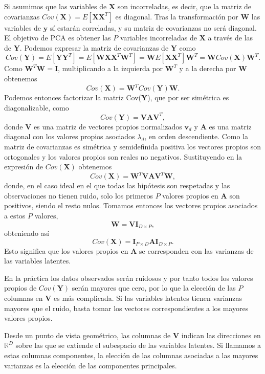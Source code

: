 Si asumimos que las variables de $\textbf{X}$ son incorreladas, es decir, que la matriz de covarianzas $Cov(\textbf{X}) = E[\textbf{X}\textbf{X}^T]$ es diagonal. Tras la transformación por $\textbf{W}$ las variables de $\textbf{y}$ sí estarán correladas, y su matriz de covarianzas no será diagonal. El objetivo de PCA es obtener las $P$ variables incorreladas de $\textbf{X}$ a través de las de $\textbf{Y}$. Podemos expresar la matriz de covarianzas de $\textbf{Y}$ como $$Cov(\textbf{Y}) = E[\textbf{Y}\textbf{Y}^T] = E[\textbf{W}\textbf{X}\textbf{X}^T\textbf{W}^T] = \textbf{W}E[\textbf{X}\textbf{X}^T]\textbf{W}^T = \textbf{W}Cov(\textbf{X})\textbf{W}^T.$$ Como $\textbf{W}^T\textbf{W} = \textbf{I}$, multiplicando a la izquierda por $\textbf{W}^T$ y a la derecha por $\textbf{W}$ obtenemos $$Cov(\textbf{X}) = \textbf{W}^TCov(\textbf{Y})\textbf{W}. $$ Podemos entonces factorizar la matriz Cov(\textbf{Y}), que por ser simétrica es diagonalizable, como $$ Cov(\textbf{Y}) = \textbf{V}\textbf{A}\textbf{V}^T,$$ donde \textbf{V} es una matriz de vectores propios normalizados $\textbf{v}_d$ y $\textbf{A}$ es una matriz diagonal con los valores propios asociados $\lambda_d$, en orden descendiente. Como la matriz de covarianzas es simétrica y semidefinida positiva los vectores propios son ortogonales y los valores propios son reales no negativos. Sustituyendo en la expresión de $Cov(\textbf{X})$ obtenemos $$Cov(\textbf{X}) = \textbf{W}^T\textbf{V}\textbf{A}\textbf{V}^T\textbf{W},$$ donde, en el caso ideal en el que todas las hipótesis son respetadas y las observaciones no tienen ruido, solo los primeros $P$ valores propios en $\textbf{A}$ son positivos, siendo el resto nulos. Tomamos entonces los vectores propios asociados a estos $P$ valores, $$\textbf{W} = \textbf{V}\textbf{I}_{D \times P},$$ obteniendo así $$Cov(\textbf{X}) = \textbf{I}_{P \times D}\textbf{A}\textbf{I}_{D \times P}.$$ Esto significa que los valores propios en $\textbf{A}$ se corresponden con las varianzas de las variables latentes.

En la práctica los datos observados serán ruidosos y por tanto todos los valores propios de $Cov(\textbf{Y})$ serán mayores que cero, por lo que la elección de las $P$ columnas en $\textbf{V}$ es más complicada. Si las variables latentes tienen varianzas mayores que el ruido, basta tomar los vectores correspondientes a los mayores valores propios.

Desde un punto de vista geométrico, las columnas de $\textbf{V}$ indican las direcciones en $\mathbb{R}^D$ sobre las que se extiende el subespacio de las variables latentes. Si llamamos a estas columnas componentes, la elección de las columnas asociadas a las mayores varianzas es la elección de las componentes principales.

